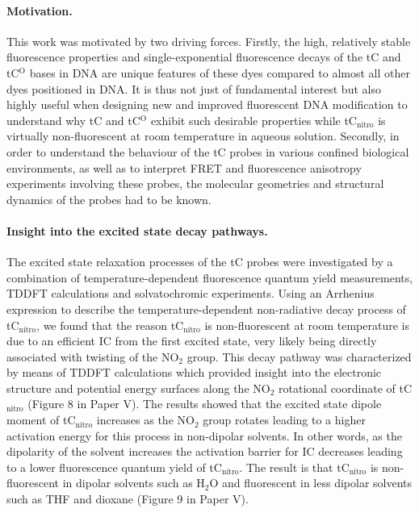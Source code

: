  \paragraph{Motivation.} This work was motivated by two driving forces. Firstly, the high, relatively stable fluorescence properties and single-exponential fluorescence decays of the tC and tC$^\mathrm{O}$ bases in DNA are unique features of these dyes compared to almost all other dyes positioned in DNA. It is thus not just of fundamental interest but also highly useful when designing new and improved fluorescent DNA modification to understand why tC and tC$^\mathrm{O}$ exhibit such desirable properties while tC$_\mathrm{nitro}$ is virtually non-fluorescent at room temperature in aqueous solution. Secondly, in order to understand the behaviour of the tC probes in various confined biological environments, as well as to interpret FRET and fluorescence anisotropy experiments involving these probes, the molecular geometries and structural dynamics of the probes had to be known.

 \paragraph{Insight into the excited state decay pathways.} The excited state relaxation processes of the tC probes were investigated by a combination of temperature-dependent fluorescence quantum yield measurements, TDDFT calculations and solvatochromic experiments.
 Using an Arrhenius expression to describe the temperature-dependent non-radiative decay process of tC$_\mathrm{nitro}$, we found that the reason tC$_\mathrm{nitro}$ is non-fluorescent at room temperature is due to an efficient IC from the first excited state, very likely being directly associated with twisting of the NO$_2$ group. This decay pathway was characterized by means of TDDFT calculations which provided insight into the electronic structure and potential energy surfaces along the NO$_2$ rotational coordinate of tC$_\mathrm{nitro}$ (Figure 8 in Paper V). The results showed that the excited state dipole moment of tC$_\mathrm{nitro}$ increases as the NO$_\mathrm{2}$ group rotates leading to a higher activation energy for this process in non-dipolar solvents. In other words, as the dipolarity of the solvent increases the activation barrier for IC decreases leading to a lower fluorescence quantum yield of tC$_\mathrm{nitro}$. The result is that tC$_\mathrm{nitro}$ is non-fluorescent in dipolar solvents such as H$_2$O and fluorescent in less dipolar solvents such as THF and dioxane (Figure 9 in Paper V).

